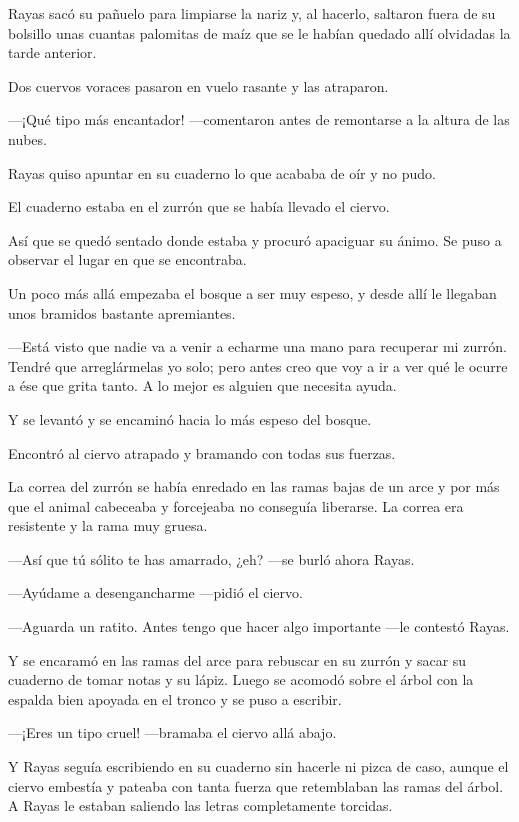 \documentclass{barcodevapor3pags}
\begin{document}
Rayas sacó su pañuelo para limpiarse la nariz y, al hacerlo, saltaron
fuera de su bolsillo unas cuantas palomitas de maíz que se le habían
quedado allí olvidadas la tarde anterior.

Dos cuervos voraces pasaron en vuelo rasante y las atraparon.

---¡Qué tipo más encantador! ---comentaron antes de remontarse a la
altura de las nubes.

Rayas quiso apuntar en su cuaderno lo que acababa de oír y no pudo.

El cuaderno estaba en el zurrón que se había llevado el ciervo.

Así que se quedó sentado donde estaba y procuró apaciguar su ánimo. Se
puso a observar el lugar en que se encontraba.

Un poco más allá empezaba el bosque a ser muy espeso, y desde allí le
llegaban unos bramidos bastante apremiantes.

---Está visto que nadie va a venir a echarme una mano para recuperar mi
zurrón. Tendré que arreglármelas yo solo; pero antes creo que voy a ir a
ver qué le ocurre a ése que grita tanto. A lo mejor es alguien que
necesita ayuda.

Y se levantó y se encaminó hacia lo más espeso del bosque.

Encontró al ciervo atrapado y bramando con todas sus fuerzas.

La correa del zurrón se había enredado en las ramas bajas de un arce y
por más que el animal cabeceaba y forcejeaba no conseguía liberarse. La
correa era resistente y la rama muy gruesa.

---Así que tú sólito te has amarrado, ¿eh? ---se burló ahora Rayas.

---Ayúdame a desengancharme ---pidió el ciervo.

---Aguarda un ratito. Antes tengo que hacer algo importante ---le
contestó Rayas.

Y se encaramó en las ramas del arce para rebuscar en su zurrón y sacar
su cuaderno de tomar notas y su lápiz. Luego se acomodó sobre el árbol
con la espalda bien apoyada en el tronco y se puso a escribir.

---¡Eres un tipo cruel! ---bramaba el ciervo allá abajo.

Y Rayas seguía escribiendo en su cuaderno sin hacerle ni pizca de caso,
aunque el ciervo embestía y pateaba con tanta fuerza que retemblaban las
ramas del árbol. A Rayas le estaban saliendo las letras completamente
torcidas.
\end{document}

